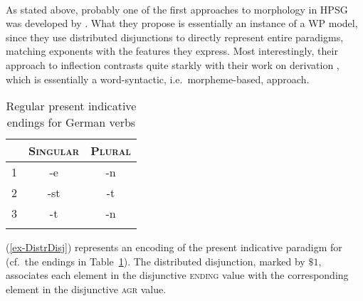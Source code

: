 \documentclass[output=paper,biblatex,babelshorthands,newtxmath,draftmode,colorlinks,citecolor=brown]{langscibook}
\begin{document}
\paragraph*{\citet{Krieger:Nerbonne:93}}
As stated above, probably one of the first approach\-es to morphology
in HPSG was developed by \citet{Krieger:Nerbonne:93}. What they
propose is essentially an instance of a WP model, since they use
distributed disjunctions to directly represent entire paradigms,
matching exponents with the features they express. Most interestingly,
their approach to inflection contrasts quite starkly with their
work on derivation \citep{Krieger:Nerbonne:93}, which is essentially a
word-syntactic, i.e.\ morpheme-based, approach.


\begin{table}
  \centering
  \begin{tabular}{r|cc}
    \lsptoprule
    & \textsc{Singular} & \textsc{Plural}\\
    \midrule
    1 & -e & -n\\
    2 & -st & -t\\
    3 & -t & -n\\
    \lspbottomrule
  \end{tabular}
  \caption{Regular present indicative endings for  German verbs}
  \label{tab:GermanEndings}
\end{table}

(\ref{ex-DistrDisj}) represents an encoding of the present indicative paradigm for 
(cf.\ the endings in Table~\ref{tab:GermanEndings}). The distributed disjunction, marked by
${\$ 1}$, associates each element in the disjunctive \textsc{ending} value with the corresponding
element in the disjunctive \textsc{agr} value.

\end{document}

